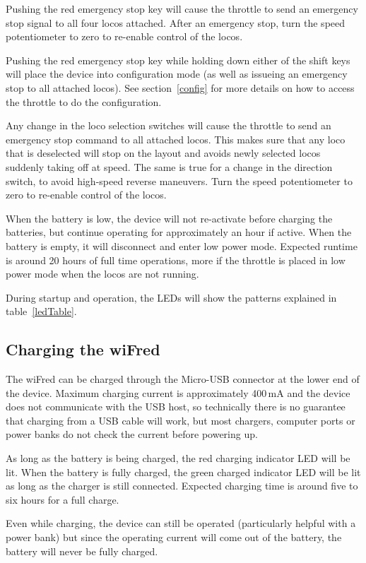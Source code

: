 \documentclass[11pt,a4paper]{scrartcl}
\begin{document}
Pushing the red emergency stop key will cause the throttle to send an emergency stop signal to all four locos attached. After an emergency stop, turn the speed potentiometer to zero to re-enable control of the locos.

Pushing the red emergency stop key while holding down either of the shift keys will place the device into configuration mode (as well as issueing an emergency stop to all attached locos). See section~\ref{config} for more details on how to access the throttle to do the configuration.

Any change in the loco selection switches will cause the throttle to send an emergency stop command to all attached locos. This makes sure that any loco that is deselected will stop on the layout and avoids newly selected locos suddenly taking off at speed. The same is true for a change in the direction switch, to avoid high-speed reverse maneuvers. Turn the speed potentiometer to zero to re-enable control of the locos.

When the battery is low, the device will not re-activate before charging the batteries, but continue operating for approximately an hour if active. When the battery is empty, it will disconnect and enter low power mode. Expected runtime is around 20 hours of full time operations, more if the throttle is placed in low power mode when the locos are not running.

During startup and operation, the LEDs will show the patterns explained in table~\ref{ledTable}.

\subsection{Charging the wiFred}

The wiFred can be charged through the Micro-USB connector at the lower end of the device. Maximum charging current is approximately 400\,mA and the device does not communicate with the USB host, so technically there is no guarantee that charging from a USB cable will work, but most chargers, computer ports or power banks do not check the current before powering up.

As long as the battery is being charged, the red charging indicator LED will be lit. When the battery is fully charged, the green charged indicator LED will be lit as long as the charger is still connected. Expected charging time is around five to six hours for a full charge.

Even while charging, the device can still be operated (particularly helpful with a power bank) but since the operating current will come out of the battery, the battery will never be fully charged.
\end{document}
